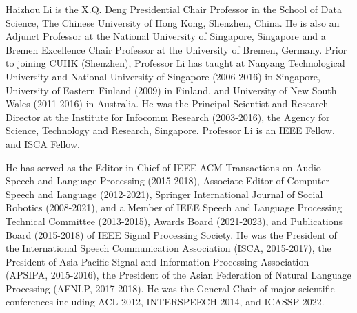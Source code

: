 Haizhou Li is the X.Q. Deng Presidential Chair Professor in the School of Data Science, The Chinese University of Hong Kong, Shenzhen, China. He is also an Adjunct Professor at the National University of Singapore, Singapore and a Bremen Excellence Chair Professor at the University of Bremen, Germany. Prior to joining CUHK (Shenzhen), Professor Li has taught at Nanyang Technological University and National University of Singapore (2006-2016) in Singapore, University of Eastern Finland (2009) in Finland, and University of New South Wales (2011-2016) in Australia. He was the Principal Scientist and Research Director at the Institute for Infocomm Research (2003-2016), the Agency for Science, Technology and Research, Singapore. Professor Li is an IEEE Fellow, and ISCA Fellow.

He has served as the Editor-in-Chief of IEEE-ACM Transactions on Audio Speech and Language Processing (2015-2018), Associate Editor of Computer Speech and Language (2012-2021), Springer International Journal of Social Robotics (2008-2021), and a Member of IEEE Speech and Language Processing Technical Committee (2013-2015), Awards Board (2021-2023), and Publications Board (2015-2018) of IEEE Signal Processing Society. He was the President of the International Speech Communication Association (ISCA, 2015-2017), the President of Asia Pacific Signal and Information Processing Association (APSIPA, 2015-2016), the President of the Asian Federation of Natural Language Processing (AFNLP, 2017-2018). He was the General Chair of major scientific conferences including ACL 2012, INTERSPEECH 2014, and ICASSP 2022.
